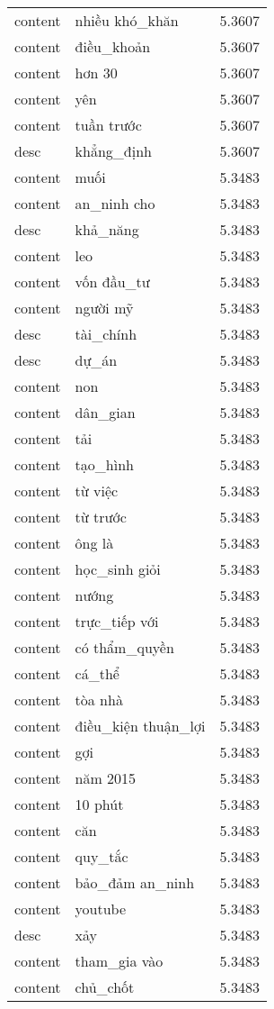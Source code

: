 \documentclass{article}
\begin{document}
\begin{tabular}{lll}
content & nhiều khó\_khăn & 5.3607\\
content & điều\_khoản & 5.3607\\
content & hơn 30 & 5.3607\\
content & yên & 5.3607\\
content & tuần trước & 5.3607\\
desc & khẳng\_định & 5.3607\\
content & muối & 5.3483\\
content & an\_ninh cho & 5.3483\\
desc & khả\_năng & 5.3483\\
content & leo & 5.3483\\
content & vốn đầu\_tư & 5.3483\\
content & người mỹ & 5.3483\\
desc & tài\_chính & 5.3483\\
desc & dự\_án & 5.3483\\
content & non & 5.3483\\
content & dân\_gian & 5.3483\\
content & tải & 5.3483\\
content & tạo\_hình & 5.3483\\
content & từ việc & 5.3483\\
content & từ trước & 5.3483\\
content & ông là & 5.3483\\
content & học\_sinh giỏi & 5.3483\\
content & nướng & 5.3483\\
content & trực\_tiếp với & 5.3483\\
content & có thẩm\_quyền & 5.3483\\
content & cá\_thể & 5.3483\\
content & tòa nhà & 5.3483\\
content & điều\_kiện thuận\_lợi & 5.3483\\
content & gợi & 5.3483\\
content & năm 2015 & 5.3483\\
content & 10 phút & 5.3483\\
content & căn & 5.3483\\
content & quy\_tắc & 5.3483\\
content & bảo\_đảm an\_ninh & 5.3483\\
content & youtube & 5.3483\\
desc & xảy & 5.3483\\
content & tham\_gia vào & 5.3483\\
content & chủ\_chốt & 5.3483\\

\end{tabular}
\end{document}
